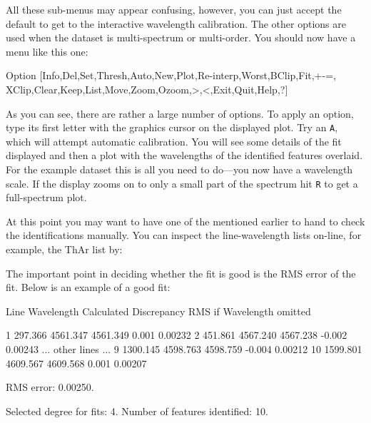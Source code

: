 \documentclass[twoside,11pt]{starlink}
\providecommand{\scspec}[2]{#1}
\begin{document}
All these sub-menus may appear confusing, however, you can just accept
the default to get to the interactive wavelength calibration.
The other options are used when the dataset is multi-spectrum or
multi-order.
You should now have a menu like this one:

{
\scspec{\small}{ }
\begin{terminalv}
    Option [Info,Del,Set,Thresh,Auto,New,Plot,Re-interp,Worst,BClip,Fit,+-=,
            XClip,Clear,Keep,List,Move,Zoom,Ozoom,>,<,Exit,Quit,Help,?]
\end{terminalv}
}

As you can see, there are rather a large number of options.  To apply an
option, type its first letter with the graphics cursor on the displayed plot.
Try an \verb+A+, which will attempt automatic calibration.  You will see
some details of the fit displayed and then a plot with the wavelengths of the
identified features overlaid.  For the example dataset this is all you
need to do\scspec{---}{ - }you now have a wavelength scale.
If the display zooms on to only a small part of the spectrum hit
\verb+R+ to get a full-spectrum plot.

At this point you may want to have one of the 
mentioned earlier to hand to check the identifications manually.
You can inspect the line-wavelength lists on-line, for example, the
ThAr list by:

{
\scspec{\small}{ }
\begin{terminalv}
\end{terminalv}
}

The important point in deciding whether the fit is good is the RMS error
of the fit.  Below is an example of a good fit:

{
\scspec{\small}{ }
\begin{terminalv}
              Line    Wavelength  Calculated Discrepancy    RMS if
                                  Wavelength                omitted

      1     297.366    4561.347    4561.349       0.001     0.00232
      2     451.861    4567.240    4567.238      -0.002     0.00243
    ... other lines ...
      9    1300.145    4598.763    4598.759      -0.004     0.00212
     10    1599.801    4609.567    4609.568       0.001     0.00207

    RMS error: 0.00250.

    Selected degree for fits: 4.
    Number of features identified: 10.
\end{terminalv}
}
\end{document}
